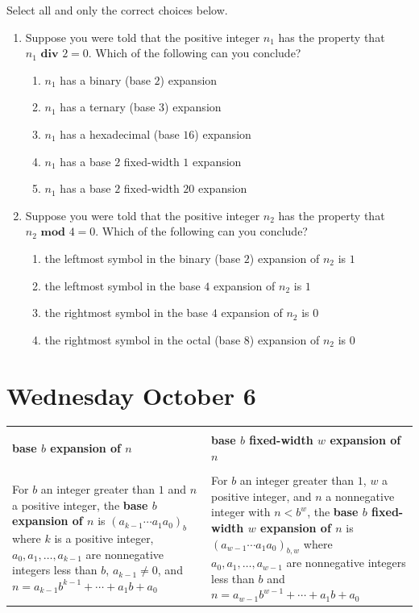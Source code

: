 \documentclass[12pt, oneside]{article}
\begin{document}
\begin{enumerate}
{Select all and only the correct choices below.
\begin{enumerate}
\item Suppose you were told that the positive integer $n_1$ has the property that $n_1 \textbf{ div } 2 = 0$. Which of the following can you conclude?
\begin{enumerate}
\item $n_1$ has a binary (base $2$) expansion
\item $n_1$ has a ternary (base $3$) expansion
\item $n_1$ has a hexadecimal (base $16$) expansion
\item $n_1$ has a base $2$ fixed-width $1$ expansion
\item $n_1$ has a base $2$ fixed-width $20$ expansion
\end{enumerate}
\item Suppose you were told that the positive integer $n_2$ has the property that $n_2 \textbf{ mod } 4 = 0$. Which of the following can you conclude?
\begin{enumerate}
\item the leftmost symbol in the binary (base $2$) expansion of $n_2$ is $1$
\item the leftmost symbol in the base $4$ expansion of $n_2$ is $1$
\item the rightmost symbol in the base $4$ expansion of $n_2$ is $0$
\item the rightmost symbol in the octal (base $8$) expansion of $n_2$ is $0$
\end{enumerate}
\end{enumerate} }
\end{enumerate}
\newpage
\section*{Wednesday October 6}


\begin{center}
    \begin{tabular}{|p{3.7in}|p{3.7in}|}
    \hline 
    &   \\
    {\bf base $b$ expansion of $n$}  & {\bf base $b$ fixed-width $w$ expansion of $n$}  \\
    & \\
    \hline  
    For $b$ an integer greater than $1$ and $n$ a positive integer, 
    the {\bf base $b$ expansion of $n$}  is $(a_{k-1} \cdots a_1 a_0)_b$
    where $k$ is a positive integer, $a_0, a_1, \ldots, a_{k-1}$ are nonnegative integers 
    less than $b$, $a_{k-1} \neq  0$, and $n =  a_{k-1} b^{k-1} + \cdots + a_1b + a_0$
    & 
    For $b$ an integer greater than $1$, $w$ a positive integer, and $n$ a nonnegative integer
    with $n <  b^w$, the {\bf base $b$ fixed-width $w$ expansion of $n$}  is
    $(a_{w-1} \cdots a_1 a_0)_{b,w}$
    where  $a_0, a_1, \ldots, a_{w-1}$ are nonnegative integers less than $b$ and 
    $n =  a_{w-1} b^{w-1} + \cdots + a_1b + a_0$\\
    \hline
    \end{tabular}
\end{center} 
\end{document}

